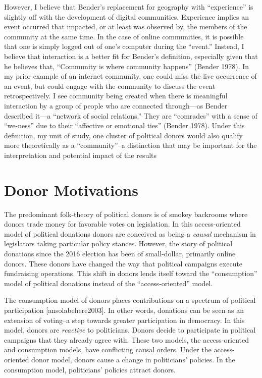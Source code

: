 \documentclass[12pt,]{article}
\begin{document}
However, I believe that Bender's replacement for geography with
``experience'' is slightly off with the development of digital
communities. Experience implies an event occurred that impacted, or at
least was observed by, the members of the community at the same time. In
the case of online communities, it is possible that one is simply logged
out of one's computer during the ``event.'' Instead, I believe that
interaction is a better fit for Bender's definition, especially given
that he believes that, ``Community is where community happens'' (Bender
1978). In my prior example of an internet community, one could miss the
live occurrence of an event, but could engage with the community to
discuss the event retrospectively. I see community being created when
there is meaningful interaction by a group of people who are connected
through---as Bender described it---a ``network of social relations.''
They are ``comrades'' with a sense of ``we-ness'' due to their
``affective or emotional ties'' (Bender 1978). Under this definition, my
unit of study, one cluster of political donors would also qualify more
theoretically as a ``community''--a distinction that may be important
for the interpretation and potential impact of the results

\hypertarget{donor-motivations}{%
\section{Donor Motivations}\label{donor-motivations}}

The predominant folk-theory of political donors is of smokey backrooms
where donors trade money for favorable votes on legislation. In this
access-oriented model of political donations donors are conceived as
being a \emph{causal} mechanism in legislators taking particular policy
stances. However, the story of political donations since the 2016
election has been of small-dollar, primarily online donors. These donors
have changed the way that political campaigns execute fundraising
operations. This shift in donors lends itself toward the ``consumption''
model of political donations instead of the ``access-oriented'' model.

The consumption model of donors places contributions on a spectrum of
political participation {[}ansolabehere2003{]}. In other words,
donations can be seen as an extension of voting--a step towards greater
participation in democracy. In this model, donors are \emph{reactive} to
politicians. Donors decide to participate in political campaigns that
they already agree with. These two models, the access-oriented and
consumption models, have conflicting causal orders. Under the
access-oriented donor model, donors cause a change in politicians'
policies. In the consumption model, politicians' policies attract
donors.
\end{document}
